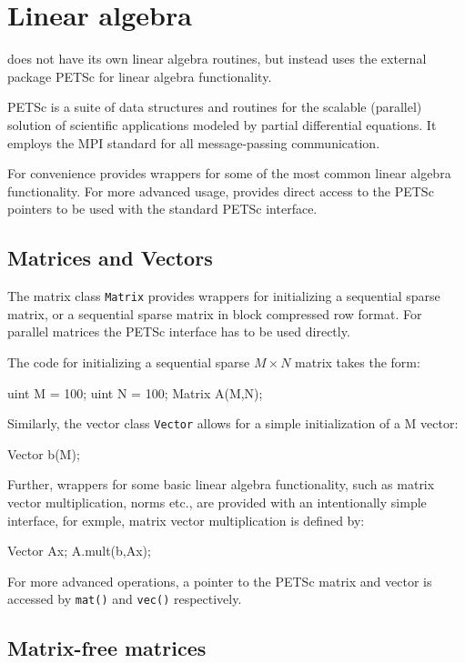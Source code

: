 \chapter{Linear algebra}

\dolfin{} does not have its own linear algebra routines, 
but instead uses the external package PETSc \cite{www:petsc} 
for linear algebra functionality.    

PETSc is a suite of data structures and routines for the scalable 
(parallel) solution of scientific applications modeled by partial 
differential equations. 
It employs the MPI standard for all message-passing communication.  

For convenience \dolfin{} provides wrappers for some of the most 
common linear algebra functionality. For more advanced usage, 
\dolfin{} provides direct access to the PETSc pointers 
to be used with the standard PETSc interface. 

\section{Matrices and Vectors}

The matrix class \texttt{Matrix} provides wrappers for initializing 
a sequential sparse matrix, or a sequential sparse matrix in 
block compressed row format. For parallel matrices the PETSc 
interface has to be used directly. 

The code for initializing a sequential sparse $M\times N$ matrix 
takes the form: 
%
\begin{code}
uint M = 100; 
uint N = 100; 
Matrix A(M,N);
\end{code}

Similarly, the vector class \texttt{Vector} allows for a simple 
initialization of a M vector:  
%
\begin{code}
Vector b(M);
\end{code}

Further, wrappers for some basic linear algebra functionality, such as matrix vector 
multiplication, norms etc., are provided with an intentionally simple interface, 
for exmple, matrix vector multiplication is defined by: 
%
\begin{code}
Vector Ax;
A.mult(b,Ax);
\end{code} 

For more advanced operations, a pointer to the PETSc matrix and vector is 
accessed by \texttt{mat()} and \texttt{vec()} respectively. 

\section{Matrix-free matrices}

